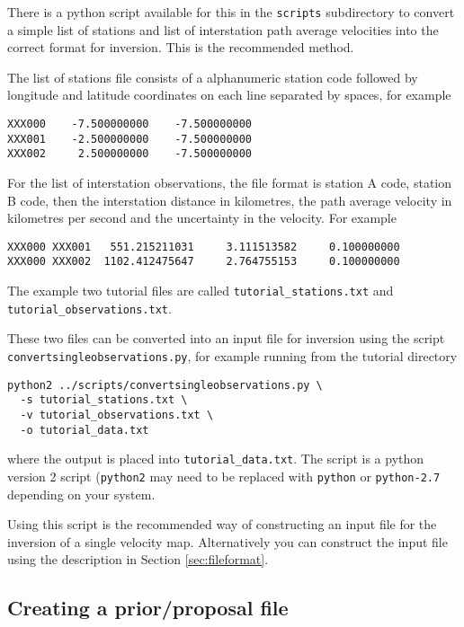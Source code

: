 \documentclass[a4paper,12pt]{article}
\begin{document}
There is a python script available for this in the {\tt scripts}
subdirectory to convert a simple list of stations and list of interstation
path average velocities into the correct format for inversion. This
is the recommended method.

The list of stations file consists of a alphanumeric station code
followed by longitude and latitude coordinates on each line separated
by spaces, for example

\begin{verbatim}
XXX000    -7.500000000    -7.500000000
XXX001    -2.500000000    -7.500000000
XXX002     2.500000000    -7.500000000
\end{verbatim}

For the list of interstation observations, the file format is
station A code, station B code, then the interstation distance in
kilometres, the path average velocity in kilometres per second
and the uncertainty in the velocity. For example

\begin{verbatim}
XXX000 XXX001   551.215211031     3.111513582     0.100000000
XXX000 XXX002  1102.412475647     2.764755153     0.100000000
\end{verbatim}

The example two tutorial files are called {\tt tutorial\_stations.txt}
and {\tt tutorial\_observations.txt}.

These two files can be converted into an input file for inversion
using the script {\tt convertsingleobservations.py}, for example
running from the tutorial directory

\begin{verbatim}
python2 ../scripts/convertsingleobservations.py \
  -s tutorial_stations.txt \
  -v tutorial_observations.txt \
  -o tutorial_data.txt
\end{verbatim}

where the output is placed into {\tt tutorial\_data.txt}. The script is
a python version 2 script ({\tt python2} may need to be replaced with {\tt python} or {\tt python-2.7}
depending on your system.

Using this script is the recommended way of constructing an input file
for the inversion of a single velocity map. Alternatively you can
construct the input file using the description in Section \ref{sec:fileformat}.

\subsection{Creating a prior/proposal file}
\end{document}
